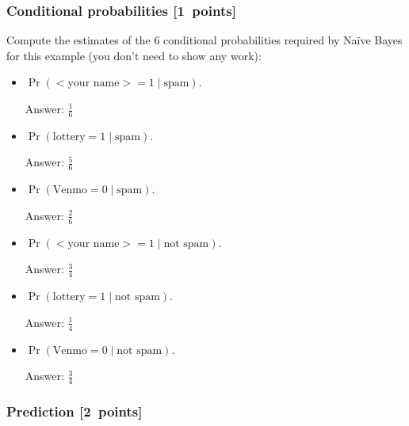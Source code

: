 \documentclass{article}
\newcommand{\blu}[1]{{\textcolor{blu}{#1}}}
\newenvironment{answer}{\par\begingroup\color{gre}Answer: }{\endgroup}
\let\ask\blu
\newcommand\pts[1]{\textcolor{pointscolour}{[#1~points]}}
\begin{document}
    \subsubsection{Conditional probabilities \pts{1}}

    \ask{Compute the estimates of the 6 conditional probabilities required by Na\"ive Bayes for this example}  (you don't need to show any work):
    \begin{itemize}
        \item $\Pr(\text{$<$your name$>$} = 1  \mid \text{spam})$.
        \begin{answer}
        $\frac{1}{6}$
        \end{answer}
        \item $\Pr(\text{lottery} = 1 \mid \text{spam})$.
        \begin{answer}
        $\frac{5}{6}$
        \end{answer}
        \item $\Pr(\text{Venmo} = 0  \mid \text{spam})$.
        \begin{answer}
        $\frac{2}{6}$
        \end{answer}
        \item $\Pr(\text{$<$your name$>$} = 1  \mid \text{not spam})$.
        \begin{answer}
        $\frac{3}{4}$
        \end{answer}
        \item $\Pr(\text{lottery} = 1  \mid \text{not spam})$.
        \begin{answer}
        $\frac{1}{4}$
        \end{answer}
        \item $\Pr(\text{Venmo} = 0  \mid \text{not spam})$.
        \begin{answer}
        $\frac{3}{4}$
        \end{answer}
    \end{itemize}

    \subsubsection{Prediction \pts{2}}
\end{document}
